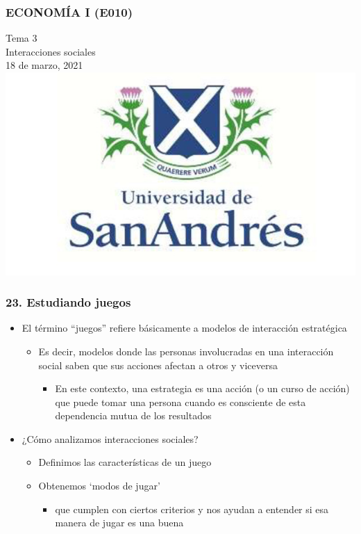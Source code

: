 \documentclass[14pt]{beamer}
\begin{document}
\begin{frame}
\frametitle{ECONOM\'{I}A I (E010)}
\centering
Tema 3 \\ Interacciones sociales \\ \vspace{12mm} 18 de marzo, 2021 \vspace{5mm} \\ \includegraphics[scale=0.25]{Figures/logoUDESA.jpg} 
\end{frame}

\begin{frame}
\frametitle{23. Estudiando juegos}
\begin{itemize}
\item El término ``juegos'' refiere básicamente a modelos de interacción estratégica
\begin{itemize}
    \item Es decir, modelos donde las personas involucradas en una interacción social saben que sus acciones afectan a otros y viceversa
    \begin{itemize}
        \item En este contexto, una estrategia es una acción (o un curso de acción) que puede tomar una persona cuando es consciente de esta dependencia mutua de los resultados
    \end{itemize}
\end{itemize}
\item ¿Cómo analizamos interacciones sociales?
\begin{itemize}
    \item Definimos las características de un juego
    \item Obtenemos ‘modos de jugar’
    \begin{itemize}
        \item que cumplen con ciertos criterios y nos ayudan a entender si esa manera de jugar es una buena
    \end{itemize}
\end{itemize}
\end{itemize}
\end{frame}
\end{document}
